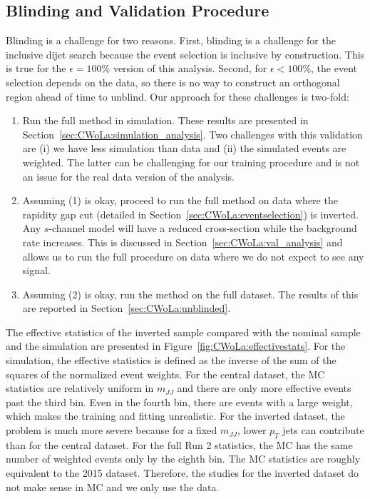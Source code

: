 \subsection{Blinding and Validation Procedure}

Blinding is a challenge for two reasons.  First, blinding is a challenge for the inclusive dijet search because the event selection is inclusive by construction.  This is true for the $\epsilon=100\%$ version of this analysis.  Second, for $\epsilon < 100\%$, the event selection depends on the data, so there is no way to construct an orthogonal region ahead of time to unblind.   Our approach for these challenges is two-fold:

\begin{enumerate}
\item Run the full method in simulation.  These results are presented in Section~\ref{sec:CWoLa:simulation_analysis}.  Two challenges with this validation are (i) we have less simulation than data and (ii) the simulated events are weighted.  The latter can be challenging for our training procedure and is not an issue for the real data version of the analysis. 
\item Assuming (1) is okay, proceed to run the full method on data where the rapidity gap cut (detailed in Section~\ref{sec:CWoLa:eventselection}) is inverted.  Any $s$-channel model will have a reduced cross-section while the background rate increases.  This is discussed in Section~\ref{sec:CWoLa:val_analysis} and allows us to run the full procedure on data where we do not expect to see any signal.
\item Assuming (2) is okay, run the method on the full dataset.  The results of this are reported in Section~\ref{sec:CWoLa:unblinded}.
\end{enumerate}

The effective statistics of the inverted sample compared with the nominal sample and the simulation are presented in Figure~\ref{fig:CWoLa:effectivestats}.   For the simulation, the effective statistics is defined as the inverse of the sum of the squares of the normalized event weights.  For the central dataset, the MC statistics are relatively uniform in $m_{JJ}$ and there are only more effective events past the third bin.  Even in the fourth bin, there are events with a large weight, which makes the training and fitting unrealistic.  For the inverted dataset, the problem is much more severe because for a fixed $m_{JJ}$, lower $p_T$ jets can contribute than for the central dataset.  For the full Run 2 statistics, the MC has the same number of weighted events only by the eighth bin.   The MC statistics are roughly equivalent to the 2015 dataset.  Therefore, the studies for the inverted dataset do not make sense in MC and we only use the data.

